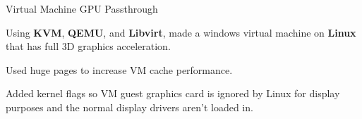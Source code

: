 


\begin{cventries}


\cventry
{} %
{Virtual Machine GPU Passthrough } %
{}%
{}%
{ %
  \begin{cvitems}
  \item{Using \textbf{KVM}, \textbf{QEMU}, and \textbf{Libvirt}, made   a windows virtual machine on \textbf{Linux} that has full 3D graphics acceleration.}
  \item{Used huge pages to increase VM cache performance.}
  \item{Added kernel flags so VM guest graphics card is ignored by Linux for display purposes and the normal display drivers aren't loaded in.}
  \end{cvitems}
}


\end{cventries}
